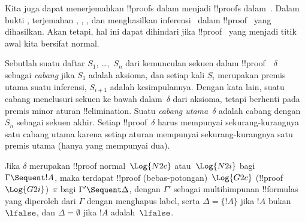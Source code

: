 \documentclass[../../../include/open-logic-section]{subfiles}
\begin{document}
Kita juga dapat menerjemahkan !!{proof}s dalam  menjadi
!!{proof}s dalam~. Dalam bukti
, terjemahan \Elim{\land}, \Elim{\lif},
\Elim{\lnot}, dan \Elim{\lforall} menghasilkan inferensi~\Cut{} dalam
!!{proof}~ yang dihasilkan. Akan tetapi, hal ini dapat dihindari
jika !!{proof}~ yang menjadi titik awal kita bersifat normal.

Sebutlah suatu daftar $S_1$, \dots,~$S_n$ dari kemunculan sekuen dalam
!!{proof}~~$\delta$ sebagai \emph{cabang} jika $S_1$ adalah
aksioma, dan setiap kali $S_i$ merupakan premis utama suatu inferensi,
$S_{i+1}$ adalah kesimpulannya. Dengan kata lain, suatu cabang menelusuri
sekuen ke bawah dalam~$\delta$ dari aksioma, tetapi berhenti pada premis
minor aturan !!{elimination}. Suatu \emph{cabang utama}~$\delta$ adalah
cabang dengan $S_n$ sebagai sekuen akhir. Setiap !!{proof}~$\delta$ harus
mempunyai sekurang-kurangnya satu cabang utama karena setiap aturan mempunyai
sekurang-kurangnya satu premis utama (hanya \Intro{\land} yang mempunyai dua).

\begin{prop} Jika $\delta$ merupakan
!!{proof} normal~$\Log{N2c}$ atau~$\Log{N2i}$ bagi
$\Gamma \Sequent !A$, maka terdapat !!{proof} (bebas-potongan)~$\Log{G2c}$
(!!{proof}~$\Log{G2i}$)~$\pi$ bagi $\Gamma' \Sequent \Delta$, dengan
$\Gamma'$ sebagai multihimpunan !!{formula}s yang diperoleh dari $\Gamma$
dengan menghapus label, serta $\Delta = \{!A\}$ jika $!A$ bukan~$\lfalse$,
dan $\Delta = \emptyset$ jika $!A$ adalah~$\lfalse$.
\end{prop}
\end{document}
